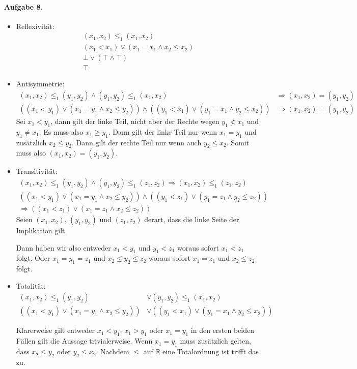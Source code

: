 \documentclass{article}
\begin{document}
\paragraph{Aufgabe 8.}
\begin{itemize}
    \item Reflexivität:
    \begin{align*}
        (x_1, x_2) \leq_1 (x_1, x_2) \\
        (x_1 < x_1) \lor (x_1 = x_1 \land x_2 \leq x_2) \\
        \bot \lor (\top \land \top) \\
        \top
    \end{align*}
    
    \item Antisymmetrie:
    \begin{align*}
        (x_1, x_2) \leq_1 (y_1, y_2) \land (y_1, y_2) \leq_1 (x_1, x_2) &\Rightarrow (x_1, x_2) = (y_1, y_2) \\
        ((x_1 < y_1) \lor (x_1 = y_1 \land x_2 \leq y_2)) \land ((y_1 < x_1) \lor (y_1 = x_1 \land y_2 \leq x_2)) &\Rightarrow (x_1, x_2) = (y_1, y_2)
    \end{align*}
    Sei $x_1 < y_1$, dann gilt der linke Teil, nicht aber der Rechte wegen $y_1 \not< x_1$ und $y_1 \neq x_1$. Es muss also $x_1 \geq y_1$. Dann gilt der linke Teil nur wenn $x_1 = y_1$ und zusätzlich $x_2 \leq y_2$. Dann gilt der rechte Teil nur wenn auch $y_2 \leq x_2$. Somit muss also $(x_1, x_2) = (y_1, y_2)$.

    \item Transitivität:
    \begin{align*}
        (x_1, x_2) \leq_1 (y_1, y_2) \land (y_1, y_2) \leq_1 (z_1, z_2) \Rightarrow (x_1, x_2) \leq_1 (z_1, z_2) \\
        ((x_1 < y_1) \lor (x_1 = y_1 \land x_2 \leq y_2)) \land ((y_1 < z_1) \lor (y_1 = z_1 \land y_2 \leq z_2)) \\ \Rightarrow ((x_1 < z_1) \lor (x_1 = z_1 \land x_2 \leq z_2))
    \end{align*}
    Seien $(x_1, x_2)$, $(y_1, y_2)$ und $(z_1, z_2)$ derart, dass die linke Seite der Implikation gilt.

    Dann haben wir also entweder $x_1 < y_1$ und $y_1 < z_1$ woraus sofort $x_1 < z_1$ folgt. Oder $x_1 = y_1 = z_1$ und $x_2 \leq y_2 \leq z_2$ woraus sofort $x_1 = z_1$ und $x_2 \leq z_2$ folgt.
    
    \item Totalität:
    \begin{align*}
        (x_1, x_2) \leq_1 (y_1, y_2) &\lor (y_1, y_2) \leq_1 (x_1, x_2) \\
        ((x_1 < y_1) \lor (x_1 = y_1 \land x_2 \leq y_2)) &\lor ((y_1 < x_1) \lor (y_1 = x_1 \land y_2 \leq x_2))
    \end{align*}

    Klarerweise gilt entweder $x_1 < y_1$, $x_1 > y_1$ oder $x_1 = y_1$ in den ersten beiden Fällen gilt die Aussage trivialerweise. Wenn $x_1 = y_1$ muss zusätzlich gelten, dass $x_2 \leq y_2$ oder $y_2 \leq x_2$. Nachdem $\leq$ auf $\mathbb{R}$ eine Totalordnung ist trifft das zu.
\end{itemize}
\end{document}
